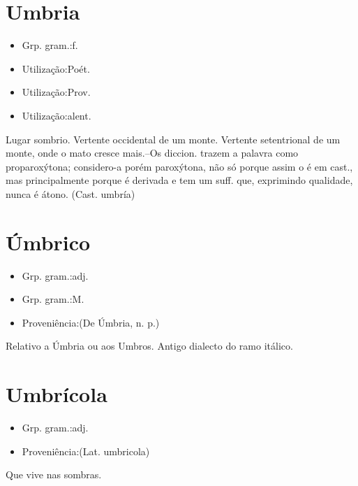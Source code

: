 \documentclass{article}
\begin{document}
\section{Umbria}
\begin{itemize}
\item {Grp. gram.:f.}
\end{itemize}
\begin{itemize}
\item {Utilização:Poét.}
\end{itemize}
\begin{itemize}
\item {Utilização:Prov.}
\end{itemize}
\begin{itemize}
\item {Utilização:alent.}
\end{itemize}
Lugar sombrio.
Vertente occidental de um monte.
Vertente setentrional de um monte, onde o mato cresce mais.--Os diccion. trazem a palavra como proparoxýtona; considero-a porém paroxýtona, não só porque assim o é em cast., mas principalmente porque é derivada e tem um suff. que, exprimindo \textunderscore qualidade\textunderscore , nunca é átono.
(Cast. \textunderscore umbría\textunderscore )
\section{Úmbrico}
\begin{itemize}
\item {Grp. gram.:adj.}
\end{itemize}
\begin{itemize}
\item {Grp. gram.:M.}
\end{itemize}
\begin{itemize}
\item {Proveniência:(De \textunderscore Úmbria\textunderscore , n. p.)}
\end{itemize}
Relativo a Úmbria ou aos Umbros.
Antigo dialecto do ramo itálico.
\section{Umbrícola}
\begin{itemize}
\item {Grp. gram.:adj.}
\end{itemize}
\begin{itemize}
\item {Proveniência:(Lat. \textunderscore umbricola\textunderscore )}
\end{itemize}
Que vive nas sombras.
\end{document}
